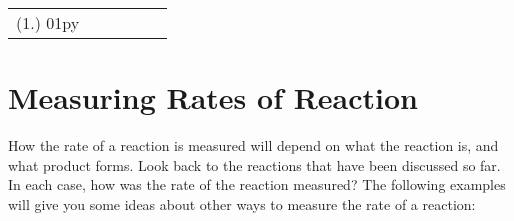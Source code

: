 {%
\par \practiceinfo
\par \begin{tabular}[h]{cccccc}
(1.)	01py	&
\end{tabular}
}






\section{Measuring Rates of Reaction}
\label{sec:reactionrates:measuring}

How the rate of a reaction is measured will depend on what the reaction is, and what product forms. Look back to the reactions that have been discussed so far. In each case, how was the rate of the reaction measured? The following examples will give you some ideas about other ways to measure the rate of a reaction:


